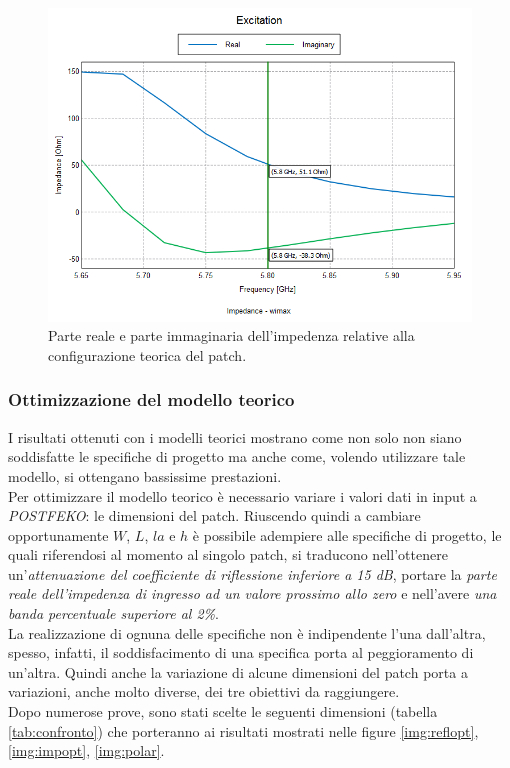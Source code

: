 \begin{figure}
\centering
\caption{Parte reale e parte immaginaria dell'impedenza relative alla configurazione teorica del patch.}
\label{img:impori}
\includegraphics[scale=0.5]{Immagini/impedance_original}
\end{figure}

\subsubsection*{Ottimizzazione del modello teorico}
I risultati ottenuti con i modelli teorici mostrano come non solo non siano soddisfatte le specifiche di progetto ma anche come, volendo utilizzare tale modello, si ottengano bassissime prestazioni. \\
Per ottimizzare il modello teorico è necessario variare i valori dati in input a \emph{POSTFEKO}: le dimensioni del patch. Riuscendo quindi a cambiare opportunamente $W$, $L$, $la$ e $h$ è possibile adempiere alle specifiche di progetto, le quali riferendosi al momento al singolo patch, si traducono nell'ottenere un'\emph{attenuazione del coefficiente di riflessione inferiore a 15 dB}, portare la \emph{parte reale dell'impedenza di ingresso ad un valore prossimo allo zero} e nell'avere \emph{una banda percentuale superiore al 2\%}. \\
La realizzazione di ognuna delle specifiche non è indipendente l'una dall'altra, spesso, infatti, il soddisfacimento di una specifica porta al peggioramento di un'altra. Quindi anche la variazione di alcune dimensioni del patch porta a variazioni, anche molto diverse, dei tre obiettivi da raggiungere. \\
Dopo numerose prove, sono stati scelte le seguenti dimensioni (tabella \ref{tab:confronto}) che porteranno ai risultati mostrati nelle figure \ref{img:reflopt}, \ref{img:impopt}, \ref{img:polar}.

